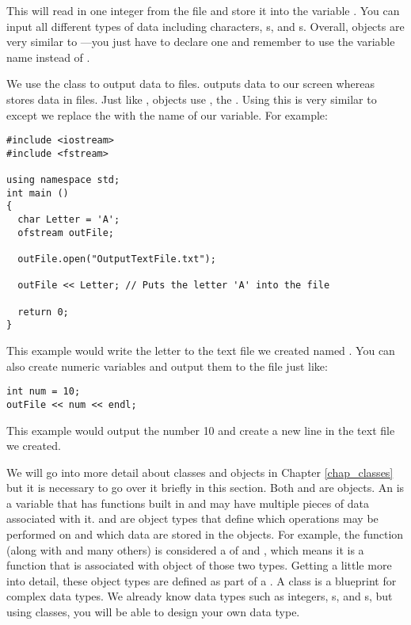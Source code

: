 This will read in one integer from the file and store it into the variable . 
You can input all different types of data including characters, s, and s. 
Overall,  objects are very similar to ---you just have to declare one and remember to use the variable name instead of .


We use the  class to output data to files. 
 outputs data to our screen whereas  stores data in files. 
Just like ,  objects use \Code{<<}, the . 
Using this is very similar to  except we replace the  with the name of our variable. 
For example: \nopagebreak[4]

\noindent\begin{minipage}{\linewidth}\begin{lstlisting}		
#include <iostream> 
#include <fstream>
		
using namespace std;
int main ()
{
  char Letter = 'A';
  ofstream outFile;

  outFile.open("OutputTextFile.txt");

  outFile << Letter; // Puts the letter 'A' into the file

  return 0;
}
\end{lstlisting}\end{minipage}

This example would write the letter  to the text file we created named . 
You can also create numeric variables and output them to the file just like:
			
\noindent\begin{minipage}{\linewidth}\begin{lstlisting}
int num = 10;
outFile << num << endl;
\end{lstlisting}\end{minipage}		

This example would output the number 10 and create a new line in the text file we created. 

	
We will go into more detail about classes and objects in Chapter \ref{chap_classes} but it is necessary to go over it briefly in this section. 
Both  and  are objects. 
An  is a variable that has functions built in and may have multiple pieces of data associated with it. 
 and  are object types that define which operations may be performed on and which data are stored in the objects. 
For example, the function  (along with  and many others) is considered a  of  and , which means it is a function that is associated with object of those two types. 
Getting a little more into detail, these object types are defined as part of a . 
A class is a blueprint for complex data types. 
We already know data types such as integers, s, and s, but using classes, you will be able to design your own data type.

